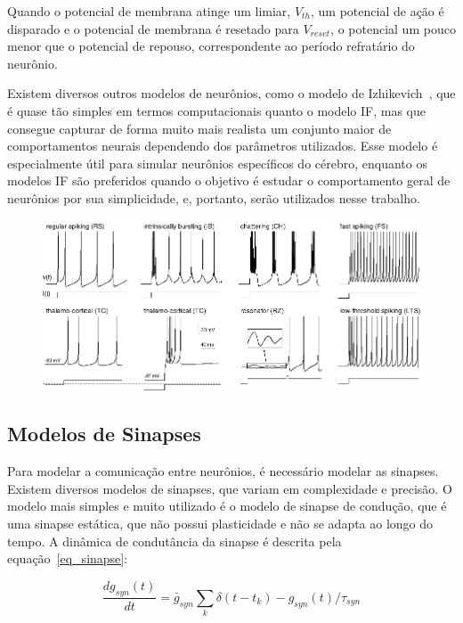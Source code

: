 Quando o potencial de membrana atinge um limiar, $V_{th}$, um potencial de ação é disparado e o potencial de membrana é resetado
para $V_{reset}$, o potencial um pouco menor que o potencial de repouso, correspondente ao período refratário do neurônio.

Existem diversos outros modelos de neurônios, como o modelo de Izhikevich~\cite{izhikevichSimple2003}, que é quase tão simples em
termos computacionais quanto o modelo IF, mas que consegue capturar de forma muito mais realista um conjunto maior de
comportamentos neurais dependendo dos parâmetros utilizados. Esse modelo é especialmente útil para simular neurônios específicos
do cérebro, enquanto os modelos IF são preferidos quando o objetivo é estudar o comportamento geral de neurônios por sua
simplicidade, e, portanto, serão utilizados nesse trabalho.

\begin{figure}[!ht]
\centering\label{fig_izhikevich}
\includegraphics[width=\linewidth]{figuras/izhikevich.png}
\end{figure}

\subsection{Modelos de Sinapses}\label{subsection_modelos_sinapses}

Para modelar a comunicação entre neurônios, é necessário modelar as sinapses. Existem diversos modelos de sinapses, que variam em
complexidade e precisão. O modelo mais simples e muito utilizado é o modelo de sinapse de condução, que é uma sinapse estática,
que não possui plasticidade e não se adapta ao longo do tempo. A dinâmica de condutância da sinapse é descrita pela
equação~\ref{eq_sinapse}:

\begin{equation}
\label{eq_sinapse}
\frac{dg_{syn}(t)}{dt} = \bar{g}_{syn}\sum_{k}{\delta(t-t_k)} - g_{syn}(t)/\tau_{syn}
\end{equation}

